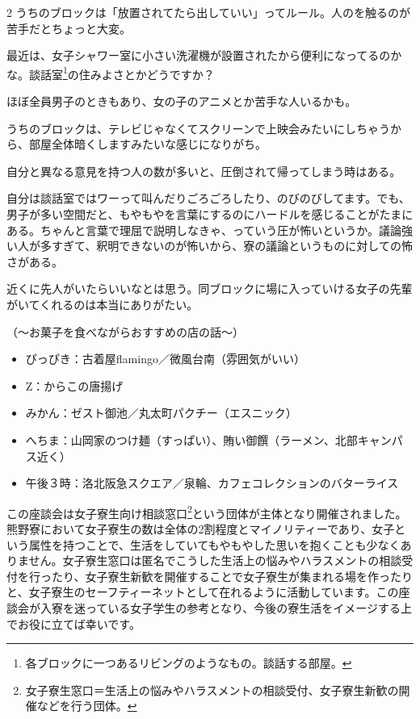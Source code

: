 \begin{multicols}{2}
 うちのブロックは「放置されてたら出していい」ってルール。人のを触るのが苦手だとちょっと大変。

 最近は、女子シャワー室に小さい洗濯機が設置されたから便利になってるのかな。談話室\footnote{各ブロックに一つあるリビングのようなもの。談話する部屋。}の住みよさとかどうですか？

 ほぼ全員男子のときもあり、女の子のアニメとか苦手な人いるかも。

 うちのブロックは、テレビじゃなくてスクリーンで上映会みたいにしちゃうから、部屋全体暗くしますみたいな感じになりがち。

 自分と異なる意見を持つ人の数が多いと、圧倒されて帰ってしまう時はある。

 自分は談話室ではワーって叫んだりごろごろしたり、のびのびしてます。でも、男子が多い空間だと、もやもやを言葉にするのにハードルを感じることがたまにある。ちゃんと言葉で理屈で説明しなきゃ、っていう圧が怖いというか。議論強い人が多すぎて、釈明できないのが怖いから、寮の議論というものに対しての怖さがある。

 近くに先人がいたらいいなとは思う。同ブロックに場に入っていける女子の先輩がいてくれるのは本当にありがたい。

（〜お菓子を食べながらおすすめの店の話〜）


\begin{itemize}
    \item ぴっぴき：古着屋flamingo／微風台南（雰囲気がいい）
    \item Z：からこの唐揚げ
    \item みかん：ゼスト御池／丸太町パクチー（エスニック）
    \item へちま：山岡家のつけ麺（すっぱい）、賄い御饌（ラーメン、北部キャンパス近く）
    \item 午後３時：洛北阪急スクエア／泉輪、カフェコレクションのバターライス
\end{itemize}

\end{multicols}


この座談会は女子寮生向け相談窓口\footnote{女子寮生窓口＝生活上の悩みやハラスメントの相談受付、女子寮生新歓の開催などを行う団体。}という団体が主体となり開催されました。熊野寮において女子寮生の数は全体の2割程度とマイノリティーであり、女子という属性を持つことで、生活をしていてもやもやした思いを抱くことも少なくありません。女子寮生窓口は匿名でこうした生活上の悩みやハラスメントの相談受付を行ったり、女子寮生新歓を開催することで女子寮生が集まれる場を作ったりと、女子寮生のセーフティーネットとして在れるように活動しています。この座談会が入寮を迷っている女子学生の参考となり、今後の寮生活をイメージする上でお役に立てば幸いです。

